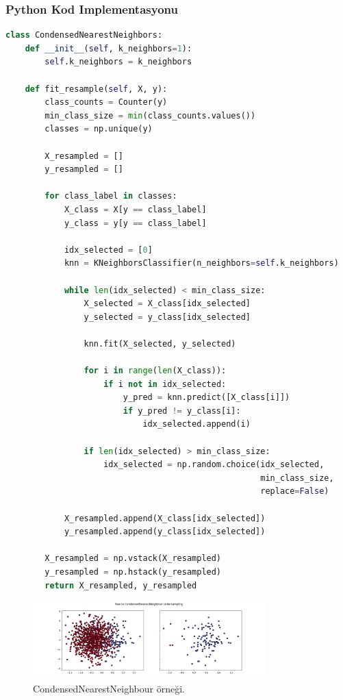 \subsubsection{Python Kod Implementasyonu}

\begin{lstlisting}[language=Python]
class CondensedNearestNeighbors:
    def __init__(self, k_neighbors=1):
        self.k_neighbors = k_neighbors

    def fit_resample(self, X, y):
        class_counts = Counter(y)
        min_class_size = min(class_counts.values())
        classes = np.unique(y)

        X_resampled = []
        y_resampled = []

        for class_label in classes:
            X_class = X[y == class_label]
            y_class = y[y == class_label]

            idx_selected = [0]
            knn = KNeighborsClassifier(n_neighbors=self.k_neighbors)

            while len(idx_selected) < min_class_size:
                X_selected = X_class[idx_selected]
                y_selected = y_class[idx_selected]

                knn.fit(X_selected, y_selected)

                for i in range(len(X_class)):
                    if i not in idx_selected:
                        y_pred = knn.predict([X_class[i]])
                        if y_pred != y_class[i]:
                            idx_selected.append(i)

                if len(idx_selected) > min_class_size:
                    idx_selected = np.random.choice(idx_selected, 
                                                    min_class_size,
                                                    replace=False)

            X_resampled.append(X_class[idx_selected])
            y_resampled.append(y_class[idx_selected])

        X_resampled = np.vstack(X_resampled)
        y_resampled = np.hstack(y_resampled)
        return X_resampled, y_resampled
\end{lstlisting}

\newpage

\begin{figure}[h]
    \centering
    \includegraphics[width=0.8\textwidth]{images/Raw vs CondensedNearestNeighbour undersampling.png}
    \caption{CondensedNearestNeighbour örneği.}
    \label{fig:enter-label}
\end{figure}

